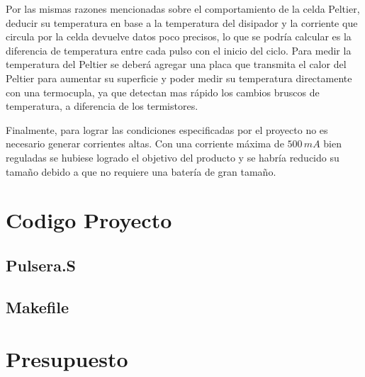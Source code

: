 \documentclass[10pt,spanish,a4paper,openany,notitlepage]{article}
\begin{document}
Por las mismas razones mencionadas sobre el comportamiento de la celda Peltier,
deducir su temperatura en base a la temperatura del disipador y la corriente
que circula por la celda devuelve datos poco precisos, lo que se podría calcular
es la diferencia de temperatura entre cada pulso con el inicio del ciclo.
Para medir la temperatura del Peltier se deberá agregar una placa que
transmita el calor del Peltier para aumentar su superficie y poder medir su
temperatura directamente con una termocupla, ya que detectan mas rápido
los cambios bruscos de temperatura, a diferencia de los termistores. 


Finalmente, para lograr las condiciones especificadas por el proyecto
no es necesario generar corrientes altas. Con una corriente máxima de
$500\, \unit{mA}$ bien reguladas se hubiese logrado el objetivo del producto
y se habría reducido su tamaño debido a que no requiere una batería de
gran tamaño.

\appendix 

\newpage
\section{Codigo Proyecto}
\subsection{Pulsera.S}

\newpage
\lstset{language=Make}
\subsection{Makefile}


\newpage
\section{Presupuesto}
\end{document}
